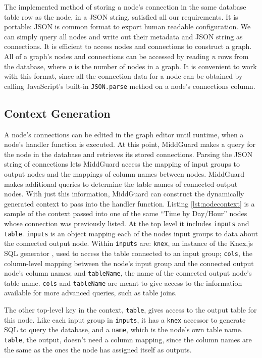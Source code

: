 \documentclass[midd]{thesis}
\begin{document}
The implemented method of storing a node's connection in the same database table
row as the node, in a JSON string, satisfied all our requirements. It is
portable: JSON is common format to export human readable configuration. We can
simply query all nodes and write out their metadata and JSON string as
connections. It is efficient to access nodes and connections to construct a
graph. All of a graph's nodes and connections can be accessed by reading
\textit{n} rows from the database, where \textit{n} is the number of nodes in a
graph. It is convenient to work with this format, since all the connection data
for a node can be obtained by calling JavaScript's built-in \texttt{JSON.parse}
method on a node's connections column.

\subsection{Context Generation}

A node's connections can be edited in the graph editor until runtime, when a
node's handler function is executed. At this point, MiddGuard makes a query for
the node in the database and retrieves its stored connections. Parsing the
JSON string of connections lets MiddGuard access the mapping of input groups to
output nodes and the mappings of column names between nodes. MiddGuard makes
additional queries to determine the table names of connected output nodes. With
just this information, MiddGuard can construct the dynamically generated context
to pass into the handler function. Listing \ref{lst:nodecontext} is a sample of
the context passed into one of the same ``Time by Day/Hour'' nodes whose
connection was previously listed. At the top level it includes \texttt{inputs}
and \texttt{table}. \texttt{inputs} is an object mapping each of the nodes input
groups to data about the connected output node. Within \texttt{inputs} are:
\texttt{knex}, an instance of the Knex.js SQL generator \cite{knexjs}, used to
access the table connected to an input group; \texttt{cols}, the column-level
mapping between the node's input group and the connected output node's column
names; and \texttt{tableName}, the name of the connected output node's table
name. \texttt{cols} and \texttt{tableName} are meant to give access to the
information available for more advanced queries, such as table joins.

The other top-level key in the context, \texttt{table}, gives access to the
output table for this node. Like each input group in \texttt{inputs}, it has a
\texttt{knex} accessor to generate SQL to query the database, and a
\texttt{name}, which is the node's own table name. \texttt{table}, the output,
doesn't need a column mapping, since the column names are the same as the ones
the node has assigned itself as outputs.
\end{document}
